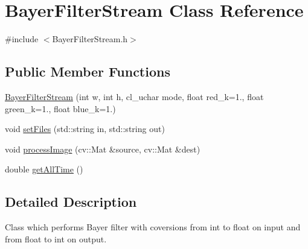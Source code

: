 \hypertarget{class_bayer_filter_stream}{\section{Bayer\-Filter\-Stream Class Reference}
\label{class_bayer_filter_stream}
}


{\ttfamily \#include $<$Bayer\-Filter\-Stream.\-h$>$}

\subsection*{Public Member Functions}
\begin{DoxyCompactItemize}
\item 
\hyperlink{class_bayer_filter_stream_abdc88b3471099e0c63a2061cc7c42065}{Bayer\-Filter\-Stream} (int w, int h, cl\-\_\-uchar mode, float red\-\_\-k=1., float green\-\_\-k=1., float blue\-\_\-k=1.)
\item 
void \hyperlink{class_bayer_filter_stream_a338682cf7b8598b3c05f919c7417d3fd}{set\-Files} (std\-::string in, std\-::string out)
\item 
void \hyperlink{class_bayer_filter_stream_a62215f60224bc4d4066faaa4f127c2e7}{process\-Image} (cv\-::\-Mat \&source, cv\-::\-Mat \&dest)
\item 
double \hyperlink{class_bayer_filter_stream_a4ebb63461b4d34cb0d0f86bc61c3441a}{get\-All\-Time} ()
\end{DoxyCompactItemize}


\subsection{Detailed Description}
Class which performs Bayer filter with coversions from int to float on input and from float to int on output. 


